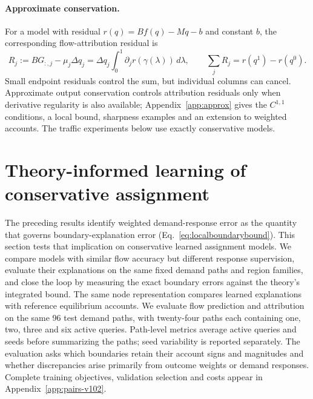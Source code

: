 \documentclass[a4paper,fleqn]{cas-sc}
\begin{document}
\paragraph{Approximate conservation.}
For a model with residual $r(q)=Bf(q)-Mq-b$ and constant $b$, the
corresponding flow-attribution residual is
\begin{equation}
R_j:=BG_{:,j}-\mu_j\Delta q_j
=\Delta q_j\int_0^1\partial_jr(\gamma(\lambda))\,d\lambda,
\qquad \sum_jR_j=r(q^1)-r(q^0).
\label{eq:residualidentity}
\end{equation}
Small endpoint residuals control the sum, but individual columns can cancel.
Approximate output conservation controls attribution residuals only when
derivative regularity is also available; Appendix~\ref{app:approx} gives
the $C^{1,1}$ conditions, a local bound, sharpness examples and an
extension to weighted accounts. The traffic experiments below use exactly
conservative models.




\FloatBarrier
\section{Theory-informed learning of conservative assignment}\label{sec:pairresults}
The preceding results identify weighted demand-response error as the
quantity that governs boundary-explanation error
(Eq.~\eqref{eq:localboundarybound}). This section tests that
implication on conservative learned assignment models. We compare
models with similar flow accuracy but different response supervision,
evaluate their explanations on the same fixed demand paths and region
families, and close the loop by measuring the exact boundary errors
against the theory's integrated bound. The same node representation
compares learned explanations with reference equilibrium accounts. We
evaluate flow prediction and attribution on the same 96 test demand
paths, with twenty-four paths each containing one, two, three and six
active queries. Path-level metrics average active queries and seeds
before summarizing the paths; seed variability is reported separately.
The evaluation asks which boundaries retain their account signs and
magnitudes and whether discrepancies arise primarily from outcome
weights or demand responses. Complete training objectives, validation
selection and costs appear in Appendix~\ref{app:pairs-v102}.

\end{document}
